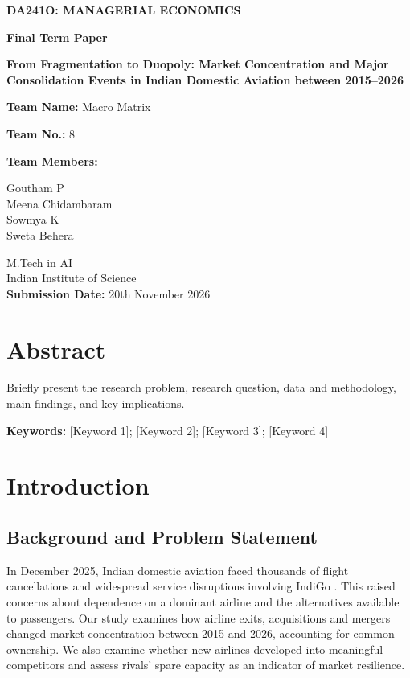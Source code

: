 \documentclass[12pt,a4paper]{article}
\begin{document}
\hypersetup{pageanchor=false}
\begin{titlepage}
\centering
\vspace*{1cm}
{\Large\bfseries DA241O: MANAGERIAL ECONOMICS\par}
\vspace{0.8cm}
{\LARGE\bfseries Final Term Paper\par}
\vspace{1cm}
{\Large\bfseries From Fragmentation to Duopoly: Market Concentration and Major Consolidation Events in Indian Domestic Aviation between 2015--2026\par}
\vspace{1cm}
{\large\textbf{Team Name:} Macro Matrix\par}
{\large\textbf{Team No.:} 8\par}
\vspace{0.75cm}
{\large\textbf{Team Members:}\par}
\vspace{0.3cm}
{\large \textcolor{authorGoutham}{Goutham P}\\
\textcolor{authorMeena}{Meena Chidambaram}\\
\textcolor{authorSowmya}{Sowmya K}\\
\textcolor{authorSweta}{Sweta Behera}\par}
\vfill
{\large M.Tech in AI\\
Indian Institute of Science\\[0.5cm]
\textbf{Submission Date:} 20th November 2026\par}
\end{titlepage}
\hypersetup{pageanchor=true}
\setcounter{page}{1}

\section*{Abstract}
Briefly present the research problem, research question, data and methodology, main findings, and key implications.

\vspace{0.5cm}
\textbf{Keywords:} [Keyword 1]; [Keyword 2]; [Keyword 3]; [Keyword 4]

\section{Introduction}
\subsection{Background and Problem Statement}
In December 2025, Indian domestic aviation faced thousands of flight cancellations and widespread service disruptions involving IndiGo \parencite{gupta2025antitrust}. This raised concerns about dependence on a dominant airline and the alternatives available to passengers. Our study examines how airline exits, acquisitions and mergers changed market concentration between 2015 and 2026, accounting for common ownership. We also examine whether new airlines developed into meaningful competitors and assess rivals' spare capacity as an indicator of market resilience.
\end{document}
